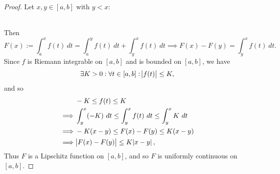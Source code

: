 \documentclass[12pt,openany]{book}
\theoremstyle{definition}
\begin{document}
	\begin{proof}
		Let $x,y\in [a,b]$ with $y<x$:
		\begin{figure}[h!]\centering
		\end{figure}\\
		Then \[
		F(x):=\int_a^xf(t)\ dt = \int_a^yf(t)\ dt+\int_y^xf(t)\ dt\implies F(x)-F(y)=\int_y^xf(t)\ dt.
		\] Since $f$ is Riemann integrable on $[a,b]$ and is bounded on $[a,b]$, we have \[
		\exists K>0:\forall t\in[a,b]: \abs{f(t)}\leq K,
		\] and so \begin{align*}
			&-K\leq f(t)\leq K\\
			\implies&\int_y^x(-K)\ dt\leq\int_y^xf(t)\ dt\leq\int_y^xK\ dt\\
			\implies&-K(x-y)\leq F(x)-F(y)\leq K(x-y)\\
			\implies&\abs{F(x)-F(y)}\leq K\abs{x-y},
		\end{align*} Thus $F$ is a Lipschitz function on $[a,b]$, and so $F$ is uniformly continuous on $[a,b]$.
	\end{proof}
	
\end{document}
